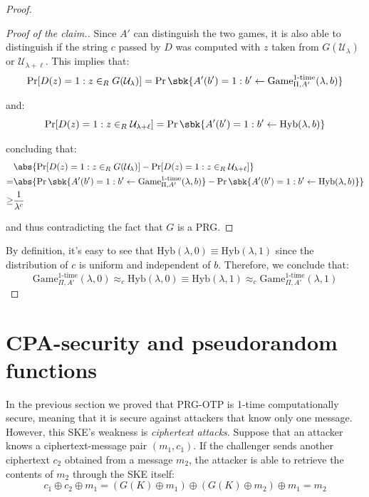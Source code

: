 \documentclass[a4paper, 12pt]{report}
\begin{document}
\begin{proof}
\begin{proof}[Proof of the claim.]
            Since $A'$ can distinguish the two games, it is also able to distinguish if the string $c$ passed by $D$ was computed with $z$ taken from $G(\mathcal{U}_\lambda)$ or $\mathcal{U}_{\lambda+\ell}$. This implies that:
            \[\Pr[D(z) = 1 : z \in_R G(\mathcal{U}_\lambda)] = \Pr\sbk{A'(b') = 1 : b' \gets \mathrm{Game}_{\Pi, A'}^{\text{1-time}}(\lambda, b)}\]

            and:
            \[\Pr[D(z) = 1 : z \in_R \mathcal{U}_{\lambda+\ell}] = \Pr\sbk{A'(b') = 1 : b' \gets \mathrm{Hyb}(\lambda, b)}\]

            concluding that:
            \[\begin{split}
                &\abs{\Pr[D(z) = 1 : z \in_R G(\mathcal{U}_\lambda)] - \Pr[D(z) = 1 : z \in_R \mathcal{U}_{\lambda+\ell}]} \\
                =& \abs{\Pr\sbk{A'(b') = 1 : b' \gets \mathrm{Game}_{\Pi, A'}^{\text{1-time}}(\lambda, b)} - \Pr\sbk{A'(b') = 1 : b' \gets \mathrm{Hyb}(\lambda, b)}} \\
                \geq& \frac{1}{\lambda^c}
            \end{split}\]

            and thus contradicting the fact that $G$ is a PRG.
        \end{proof}
        
        By definition, it's easy to see that $\mathrm{Hyb}(\lambda, 0) \equiv \mathrm{Hyb}(\lambda, 1)$ since the distribution of $c$ is uniform and independent of $b$. Therefore, we conclude that:
        \[\mathrm{Game}_{\Pi, A'}^{\text{1-time}}(\lambda, 0) \approx_c \mathrm{Hyb}(\lambda, 0) \equiv \mathrm{Hyb}(\lambda, 1) \approx_c \mathrm{Game}_{\Pi, A'}^{\text{1-time}}(\lambda, 1)\]
    \end{proof}

    \newpage

    \section{CPA-security and pseudorandom functions}

    In the previous section we proved that PRG-OTP is 1-time computationally secure, meaning that it is secure against attackers that know only one message. However, this SKE's weakness is \textit{ciphertext attacks}. Suppose that an attacker knows a ciphertext-message pair $(m_1, c_1)$. If the challenger sends another ciphertext $c_2$ obtained from a message $m_2$, the attacker is able to retrieve the contents of $m_2$ through the SKE itself:
    \[c_1 \oplus c_2 \oplus m_1 = (G(K) \oplus m_1) \oplus (G(K) \oplus m_2) \oplus m_1 = m_2\]
    
\end{document}
